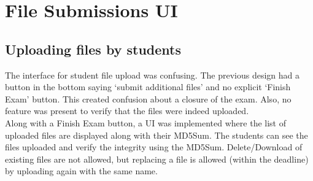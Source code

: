 \section{File Submissions UI}

\subsection{Uploading files by students}
The interface for student file upload was confusing. The previous design had a button in the bottom saying `submit additional files' and no explicit `Finish Exam' button. This created confusion about a closure of the exam. Also, no feature was present to verify that the files were indeed uploaded.\\

Along with a Finish Exam button, a UI was implemented where the list of uploaded files are displayed along with their MD5Sum. The students can see the files uploaded and verify the integrity using the MD5Sum. Delete/Download of existing files are not allowed, but replacing a file is allowed (within the deadline) by uploading again with the same name.\\

